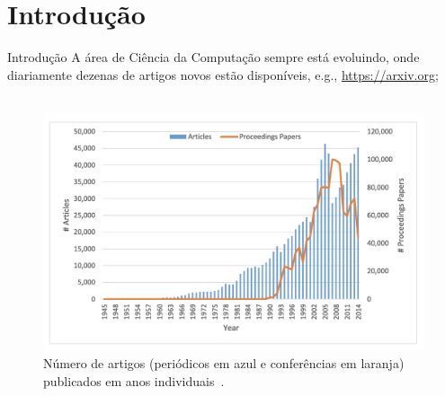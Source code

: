 \section{Introdução}
\label{s.introduction}

\begin{frame}{Introdução}
	\vspace{0.4cm}
	\justify A área de Ciência da Computação sempre está evoluindo, onde diariamente dezenas de artigos novos estão disponíveis, e.g., \url{https://arxiv.org};
	\\~\\
	\begin{figure}
		\centering
		\includegraphics[scale=0.3]{figs/number_of_papers.png}
		\caption{Número de artigos (periódicos em azul e conferências em laranja) publicados em anos individuais~\cite{Fiala:17}.}
	\end{figure}
\end{frame}

